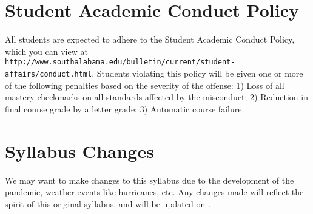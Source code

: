 \documentclass{article}
\begin{document}
\section*{\fontsize{12}{15}\selectfont Student Academic Conduct Policy}
All students are expected to adhere to the Student Academic Conduct Policy, which you can view at
{\tt http://www.southalabama.edu/bulletin/current/student-affairs/conduct.html}.  Students violating this policy will be given one or more of the following penalties based on the severity of the offense:  1) Loss of all mastery checkmarks on all standards affected by the misconduct; 2) Reduction in final course grade by a letter grade; 3) Automatic course failure.


\section*{\fontsize{12}{15}\selectfont Syllabus Changes}
We may want to make changes to this syllabus due to the development of the pandemic, weather events like hurricanes, etc. Any changes made will reflect the spirit of this original syllabus, and will be updated on \LMS.
\end{document}
